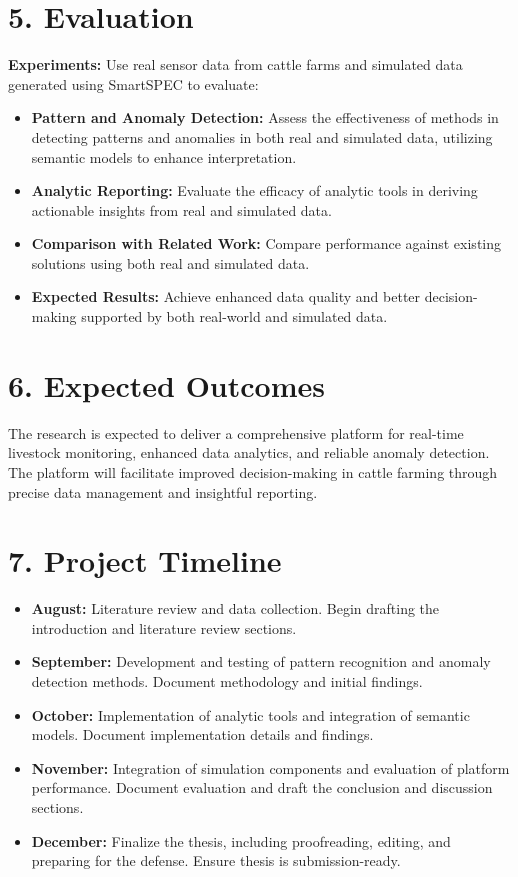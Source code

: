 \documentclass[11pt]{article}
\begin{document}
\section*{5. Evaluation}
\textbf{Experiments:} Use real sensor data from cattle farms and simulated data generated using SmartSPEC to evaluate:
\begin{itemize}
    \item \textbf{Pattern and Anomaly Detection:} Assess the effectiveness of methods in detecting patterns and anomalies in both real and simulated data, utilizing semantic models to enhance interpretation.
    \item \textbf{Analytic Reporting:} Evaluate the efficacy of analytic tools in deriving actionable insights from real and simulated data.
    \item \textbf{Comparison with Related Work:} Compare performance against existing solutions using both real and simulated data.
    \item \textbf{Expected Results:} Achieve enhanced data quality and better decision-making supported by both real-world and simulated data.
\end{itemize}



\section*{6. Expected Outcomes}
The research is expected to deliver a comprehensive platform for real-time livestock monitoring, enhanced data analytics, and reliable anomaly detection. The platform will facilitate improved decision-making in cattle farming through precise data management and insightful reporting.

\section*{7. Project Timeline}
\begin{itemize}
    \item \textbf{August:} Literature review and data collection. Begin drafting the introduction and literature review sections.
    \item \textbf{September:} Development and testing of pattern recognition and anomaly detection methods. Document methodology and initial findings.
    \item \textbf{October:} Implementation of analytic tools and integration of semantic models. Document implementation details and findings.
    \item \textbf{November:} Integration of simulation components and evaluation of platform performance. Document evaluation and draft the conclusion and discussion sections.
    \item \textbf{December:} Finalize the thesis, including proofreading, editing, and preparing for the defense. Ensure thesis is submission-ready.
\end{itemize}
\end{document}
